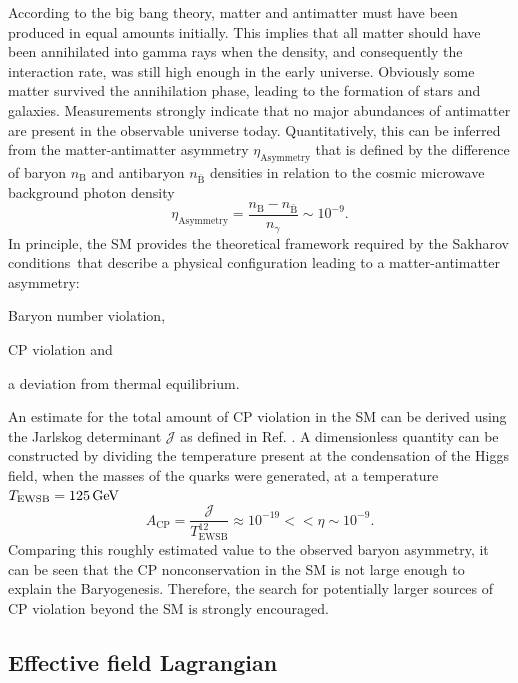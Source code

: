 According to the big bang theory, matter and antimatter must have been produced in equal amounts initially. 
This implies that all matter should have been annihilated into gamma rays when the density, and consequently the interaction rate, was still high enough 
in the early universe. Obviously some matter survived the annihilation phase, leading to the formation of stars and galaxies. Measurements
strongly indicate that no major abundances of antimatter are present in the observable universe today. Quantitatively, this can be 
inferred from the matter-antimatter asymmetry $\eta_\text{Asymmetry}$ that is defined by the difference of baryon $n_\text{B}$ and antibaryon $n_{\bar{\text{B}}}$ densities in relation to the cosmic microwave background photon density
\begin{equation}
    \eta_\text{Asymmetry} = \frac{n_\text{B} - n_{\bar{\text{B}}}}{n_{\gamma}} \sim 10^{-9}.
\end{equation}
In principle, the SM provides the theoretical framework required by the Sakharov conditions\,\cite{Sakharov:1967dj} that describe a physical configuration leading to a 
matter-antimatter asymmetry:
\begin{ct_version_list}
    \item Baryon number violation,
    \item CP violation and
    \item a deviation from thermal equilibrium.
\end{ct_version_list}
An estimate for the total amount of CP violation in the SM can be derived using the Jarlskog determinant $\mathcal{J}$ as defined in Ref. \cite{PhysRevLett.55.1039}. 
A dimensionless quantity can be constructed by dividing  the temperature present at the condensation of the Higgs field, when the masses of the quarks were generated, at a temperature $T_\text{EWSB}=\text{125\,{GeV}}$
\begin{equation}
    A_\text{CP} = \frac{\mathcal{J}}{T_\text{EWSB}^{12}} \approx 10^{-19} << \eta \sim 10^{-9}.
\end{equation}
\newpage{}
Comparing this roughly estimated value to the observed baryon asymmetry, it can be seen that the CP nonconservation in the SM is not large enough to explain the Baryogenesis. Therefore, the search for potentially larger sources of CP violation beyond the SM is strongly encouraged.

\subsection{Effective field Lagrangian}


